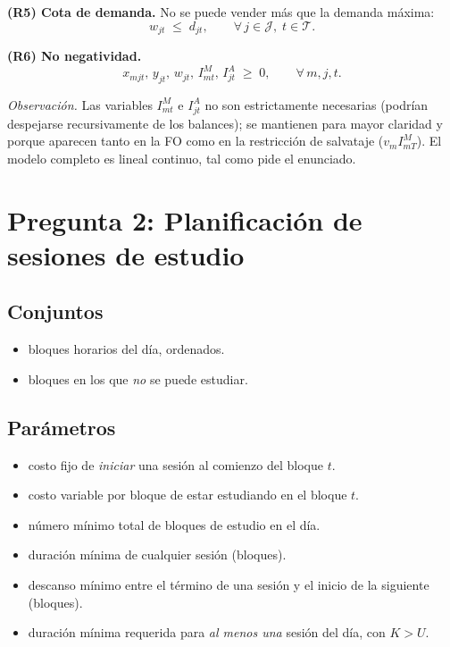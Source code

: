 \documentclass{article}
\begin{document}
\medskip
\noindent\textbf{(R5) Cota de demanda.} No se puede vender m\'as que la demanda m\'axima:
\[
w_{jt} \;\leq\; d_{jt}, \qquad \forall\, j\in\mathcal{J},\; t\in\mathcal{T}.
\]

\medskip
\noindent\textbf{(R6) No negatividad.}
\[
x_{mjt},\, y_{jt},\, w_{jt},\, I^{M}_{mt},\, I^{A}_{jt} \;\geq\; 0, \qquad \forall\, m,j,t.
\]

\medskip

\noindent\emph{Observaci\'on.} Las variables $I^{M}_{mt}$ e $I^{A}_{jt}$ no son estrictamente necesarias (podr\'ian despejarse recursivamente de los balances); se mantienen para mayor claridad y porque aparecen tanto en la FO como en la restricci\'on de salvataje ($v_m I^M_{mT}$). El modelo completo es lineal continuo, tal como pide el enunciado.

\newpage

\section*{Pregunta 2: Planificaci\'on de sesiones de estudio}

\subsection*{Conjuntos}
\begin{itemize}[leftmargin=2.2cm]
    \item[$\mathcal{T}=\{1,\dots,T\}$:] bloques horarios del d\'ia, ordenados.
    \item[$\mathcal{B}\subseteq\mathcal{T}$:] bloques en los que \emph{no} se puede estudiar.
\end{itemize}

\subsection*{Par\'ametros}
\begin{itemize}[leftmargin=2.0cm]
    \item[$h_t$:] costo fijo de \emph{iniciar} una sesi\'on al comienzo del bloque $t$.
    \item[$c_t$:] costo variable por bloque de estar estudiando en el bloque $t$.
    \item[$H$:] n\'umero m\'inimo total de bloques de estudio en el d\'ia.
    \item[$U$:] duraci\'on m\'inima de cualquier sesi\'on (bloques).
    \item[$D$:] descanso m\'inimo entre el t\'ermino de una sesi\'on y el inicio de la siguiente (bloques).
    \item[$K$:] duraci\'on m\'inima requerida para \emph{al menos una} sesi\'on del d\'ia, con $K>U$.
\end{itemize}
\end{document}
